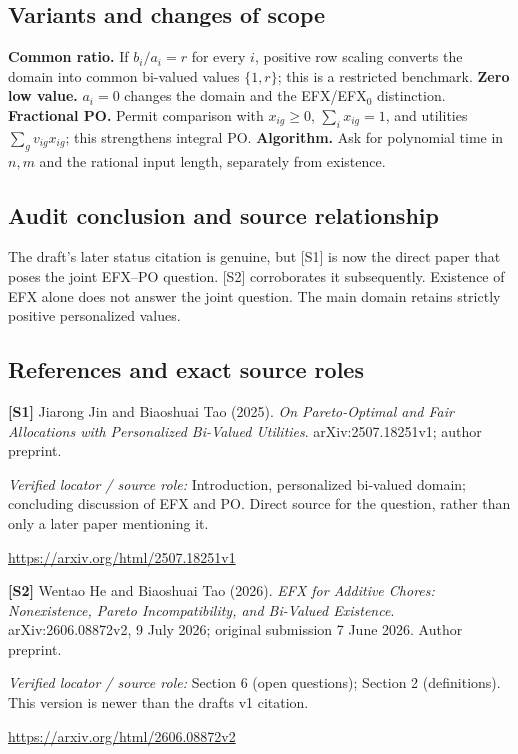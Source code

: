 \documentclass[11pt,a4paper]{article}
\begin{document}
\subsection*{Variants and changes of scope}

\textbf{Common ratio.} If $b_i/a_i=r$ for every $i$, positive row scaling converts the domain into common bi-valued values $\{1,r\}$; this is a restricted benchmark. \textbf{Zero low value.} $a_i=0$ changes the domain and the EFX/EFX$_0$ distinction. \textbf{Fractional PO.} Permit comparison with $x_{ig}\geq0$, $\sum_i x_{ig}=1$, and utilities $\sum_gv_{ig}x_{ig}$; this strengthens integral PO. \textbf{Algorithm.} Ask for polynomial time in $n,m$ and the rational input length, separately from existence.

\subsection*{Audit conclusion and source relationship}

The draft's later status citation is genuine, but [S1] is now the direct paper that poses the joint EFX--PO question. [S2] corroborates it subsequently. Existence of EFX alone does not answer the joint question. The main domain retains strictly positive personalized values.

\subsection*{References and exact source roles}

{\footnotesize\raggedright
\par\noindent\textbf{[S1]} Jiarong Jin and Biaoshuai Tao (2025). \emph{On Pareto-Optimal and Fair Allocations with Personalized Bi-Valued Utilities}. arXiv:2507.18251v1; author preprint.\par \textit{Verified locator / source role:} Introduction, personalized bi-valued domain; concluding discussion of EFX and PO. Direct source for the question, rather than only a later paper mentioning it.\par \url{https://arxiv.org/html/2507.18251v1}\par\smallskip
\par\noindent\textbf{[S2]} Wentao He and Biaoshuai Tao (2026). \emph{EFX for Additive Chores: Nonexistence, Pareto Incompatibility, and Bi-Valued Existence}. arXiv:2606.08872v2, 9 July 2026; original submission 7 June 2026. Author preprint.\par \textit{Verified locator / source role:} Section 6 (open questions); Section 2 (definitions). This version is newer than the draft\textquotesingle s v1 citation.\par \url{https://arxiv.org/html/2606.08872v2}\par\smallskip
}
\end{document}
